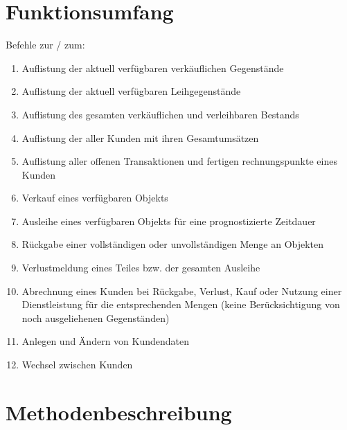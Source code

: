 \documentclass[a4paper,12pt,titlepage]{article}
\begin{document}
\section{Funktionsumfang}
Befehle zur / zum:
\begin{enumerate}
\item Auflistung der aktuell verfügbaren verkäuflichen Gegenstände
\item Auflistung der aktuell verfügbaren  Leihgegenstände
\item Auflistung des gesamten verkäuflichen und verleihbaren Bestands
\item Auflistung der aller Kunden mit ihren Gesamtumsätzen
\item Auflistung aller offenen Transaktionen  und fertigen rechnungspunkte eines Kunden
\item Verkauf eines verfügbaren Objekts
\item Ausleihe eines verfügbaren Objekts für eine prognostizierte Zeitdauer
\item Rückgabe einer vollständigen oder unvollständigen Menge an Objekten
\item Verlustmeldung eines Teiles bzw. der gesamten Ausleihe
\item Abrechnung eines Kunden bei  Rückgabe, Verlust, Kauf oder Nutzung einer Dienstleistung für die entsprechenden Mengen (keine Berücksichtigung von noch ausgeliehenen Gegenständen)
\item Anlegen und Ändern von Kundendaten
\item Wechsel zwischen Kunden
\end{enumerate}
\section{Methodenbeschreibung}
\end{document}
